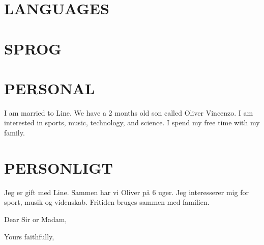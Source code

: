\documentclass[11pt,a4paper,sans]{moderncv}        %
\begin{document}
\section{LANGUAGES}
\else
\section{SPROG}
\fi

\ifenglish
\section{PERSONAL}
I am married to Line. We have a 2 months old son called Oliver Vincenzo. I am interested in sports, music, technology, and science. I spend my free time with my family.
\else
\section{PERSONLIGT}
Jeg er gift med Line. Sammen har vi Oliver på 6 uger. Jeg interesserer mig for sport, musik og videnskab. Fritiden bruges sammen med familien.
\fi


\nocite{*}



\clearpage
\date{}
\opening{Dear Sir or Madam,}
\closing{Yours faithfully,}
\makelettertitle







\makeletterclosing

\end{document}
